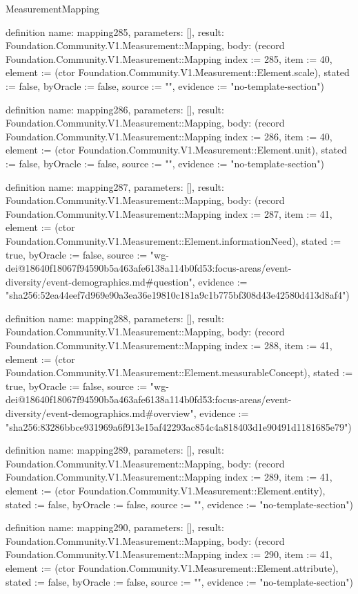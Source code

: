 \begin{lexlean}{MeasurementMapping}
\begin{semanticmodule}
definition{
  name: mapping285,
  parameters: [],
  result: Foundation.Community.V1.Measurement::Mapping,
  body: (record Foundation.Community.V1.Measurement::Mapping {index := 285, item := 40, element := (ctor Foundation.Community.V1.Measurement::Element.scale), stated := false, byOracle := false, source := "", evidence := "no-template-section"})
}

definition{
  name: mapping286,
  parameters: [],
  result: Foundation.Community.V1.Measurement::Mapping,
  body: (record Foundation.Community.V1.Measurement::Mapping {index := 286, item := 40, element := (ctor Foundation.Community.V1.Measurement::Element.unit), stated := false, byOracle := false, source := "", evidence := "no-template-section"})
}

definition{
  name: mapping287,
  parameters: [],
  result: Foundation.Community.V1.Measurement::Mapping,
  body: (record Foundation.Community.V1.Measurement::Mapping {index := 287, item := 41, element := (ctor Foundation.Community.V1.Measurement::Element.informationNeed), stated := true, byOracle := false, source := "wg-dei@18640f18067f94590b5a463afe6138a114b0fd53:focus-areas/event-diversity/event-demographics.md#question", evidence := "sha256:52ea44eef7d969e90a3ea36e19810c181a9c1b775bf308d43e42580d413d8af4"})
}

definition{
  name: mapping288,
  parameters: [],
  result: Foundation.Community.V1.Measurement::Mapping,
  body: (record Foundation.Community.V1.Measurement::Mapping {index := 288, item := 41, element := (ctor Foundation.Community.V1.Measurement::Element.measurableConcept), stated := true, byOracle := false, source := "wg-dei@18640f18067f94590b5a463afe6138a114b0fd53:focus-areas/event-diversity/event-demographics.md#overview", evidence := "sha256:83286bbce931969a6f913e15af42293ac854c4a818403d1e90491d1181685e79"})
}

definition{
  name: mapping289,
  parameters: [],
  result: Foundation.Community.V1.Measurement::Mapping,
  body: (record Foundation.Community.V1.Measurement::Mapping {index := 289, item := 41, element := (ctor Foundation.Community.V1.Measurement::Element.entity), stated := false, byOracle := false, source := "", evidence := "no-template-section"})
}

definition{
  name: mapping290,
  parameters: [],
  result: Foundation.Community.V1.Measurement::Mapping,
  body: (record Foundation.Community.V1.Measurement::Mapping {index := 290, item := 41, element := (ctor Foundation.Community.V1.Measurement::Element.attribute), stated := false, byOracle := false, source := "", evidence := "no-template-section"})
}


\end{semanticmodule}
\end{lexlean}
